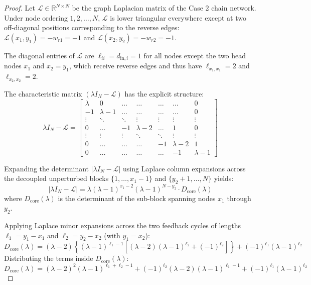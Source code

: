 \begin{proof}
Let $\mathcal{L} \in \mathbb{R}^{N \times N}$ be the graph Laplacian matrix of the Case 2 chain network. Under node ordering $1, 2, \dots, N$, $\mathcal{L}$ is lower triangular everywhere except at two off-diagonal positions corresponding to the reverse edges: $\mathcal{L}(x_1, y_1) = -w_{r1} = -1$ and $\mathcal{L}(x_2, y_2) = -w_{r2} = -1$. 

The diagonal entries of $\mathcal{L}$ are $\ell_{ii} = d_{\text{in}, i} = 1$ for all nodes except the two head nodes $x_1$ and $x_2 = y_1$, which receive reverse edges and thus have $\ell_{x_1, x_1} = 2$ and $\ell_{x_2, x_2} = 2$.

The characteristic matrix $(\lambda I_N - \mathcal{L})$ has the explicit structure:
\begin{equation}
	\lambda I_N - \mathcal{L} = \begin{bmatrix}
		\lambda & 0 & \dots & \dots & \dots & \dots & 0 \\
		-1 & \lambda-1 & \dots & \dots & \dots & \dots & 0 \\
		\vdots & \ddots & \ddots & \vdots & \vdots & \vdots & \vdots \\
		0 & \dots & -1 & \lambda-2 & \dots & 1 & 0 \\
		\vdots & \vdots & \vdots & \ddots & \ddots & \vdots & \vdots \\
		0 & \dots & \dots & \dots & -1 & \lambda-2 & 1 \\
		0 & \dots & \dots & \dots & \dots & -1 & \lambda-1
	\end{bmatrix}
\end{equation}

Expanding the determinant $|\lambda I_N - \mathcal{L}|$ using Laplace column expansions across the decoupled unperturbed blocks $\{1, \dots, x_1-1\}$ and $\{y_2+1, \dots, N\}$ yields:
\begin{equation}\label{eq:det_decoupled}
	|\lambda I_N - \mathcal{L}| = \lambda (\lambda-1)^{x_1-2} (\lambda-1)^{N-y_2} \cdot D_{\text{core}}(\lambda)
\end{equation}
where $D_{\text{core}}(\lambda)$ is the determinant of the sub-block spanning nodes $x_1$ through $y_2$. 

Applying Laplace minor expansions across the two feedback cycles of lengths $\ell_1 = y_1 - x_1$ and $\ell_2 = y_2 - x_2$ (with $y_1 = x_2$):
\begin{equation}\label{eq:D_core_expansion}
	D_{\text{core}}(\lambda) = (\lambda-2) \left\{ (\lambda-1)^{\ell_1-1} \left[ (\lambda-2)(\lambda-1)^{\ell_2} + (-1)^{\ell_2} \right] \right\} + (-1)^{\ell_1} (\lambda-1)^{\ell_2}
\end{equation}
Distributing the terms inside $D_{\text{core}}(\lambda)$:
\begin{equation}\label{eq:D_core_expanded}
	D_{\text{core}}(\lambda) = (\lambda-2)^2 (\lambda-1)^{\ell_1+\ell_2-1} + (-1)^{\ell_2}(\lambda-2)(\lambda-1)^{\ell_1-1} + (-1)^{\ell_1}(\lambda-1)^{\ell_2}
\end{equation}


\end{proof}
